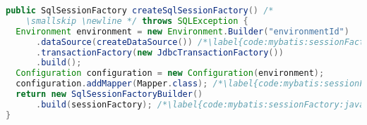 
\begin{lstlisting}[language=Java, caption={Configuration of \Code{SqlSessionFactory} in Java}, label={code:mybatis:sessionFactory:java}]
public SqlSessionFactory createSqlSessionFactory() /*
    \smallskip \newline */ throws SQLException {
  Environment environment = new Environment.Builder("environmentId")
      .dataSource(createDataSource()) /*\label{code:mybatis:sessionFactory:java:dataSource}*/
      .transactionFactory(new JdbcTransactionFactory())
      .build();
  Configuration configuration = new Configuration(environment);
  configuration.addMapper(Mapper.class); /*\label{code:mybatis:sessionFactory:java:addMapper}*/
  return new SqlSessionFactoryBuilder()
      .build(sessionFactory); /*\label{code:mybatis:sessionFactory:java:sessionFactory}*/
}
\end{lstlisting}
